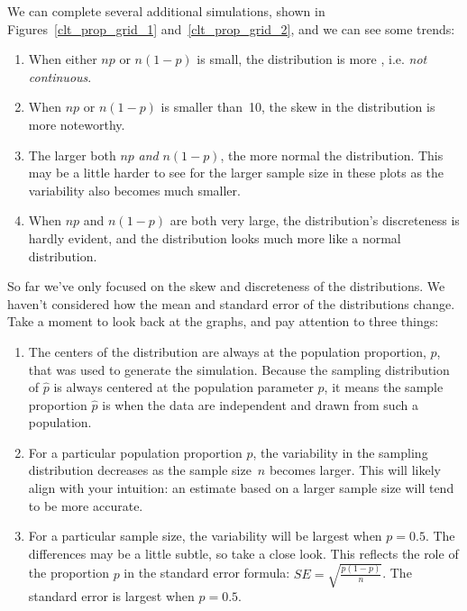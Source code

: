 We can complete several additional simulations,
shown in
Figures~\ref{clt_prop_grid_1}
and~\ref{clt_prop_grid_2},
and we can see some trends:
\begin{enumerate}
\item When either $np$ or $n(1 - p)$ is small, the
    distribution is more ,
    i.e. \emph{not continuous}.
\item When $np$ or $n(1-p)$ is smaller than~10,
    the skew in the distribution is more noteworthy.
\item The larger both $np$ \emph{and} $n(1 - p)$,
    the more normal the distribution.
    This may be a little harder to see for the larger
    sample size in these plots as the variability
    also becomes much smaller.
\item When $np$ and $n(1 - p)$ are both very large,
    the distribution's discreteness is hardly evident,
    and the distribution looks much more
    like a normal distribution.
\end{enumerate}

\D{\newpage}

So far we've only focused on the skew and discreteness
of the distributions.
We haven't considered how the mean and standard error
of the distributions change.
Take a moment to look back at the graphs,
and pay attention to three things:
\begin{enumerate}
\item The centers of the distribution are always at
    the population proportion, $p$, that was used to
    generate the simulation. Because the sampling
    distribution of $\hat{p}$ is always centered at
    the population parameter $p$, it means the sample
    proportion $\hat{p}$ is  when
    the data are independent and drawn from such
    a population.
\item For a particular population proportion $p$,
    the variability in the sampling distribution
    decreases as the sample size~$n$ becomes larger.
    This will likely align with your intuition:
    an estimate based on a larger sample size will
    tend to be more accurate.
\item For a particular sample size, the variability
    will be largest when $p = 0.5$. The differences
    may be a little subtle, so take a close look.
    This reflects the role of the proportion
    $p$ in the standard error formula:
    $SE = \sqrt{\frac{p (1 - p)}{n}}$.
    The standard error is largest when $p = 0.5$.
\end{enumerate}

